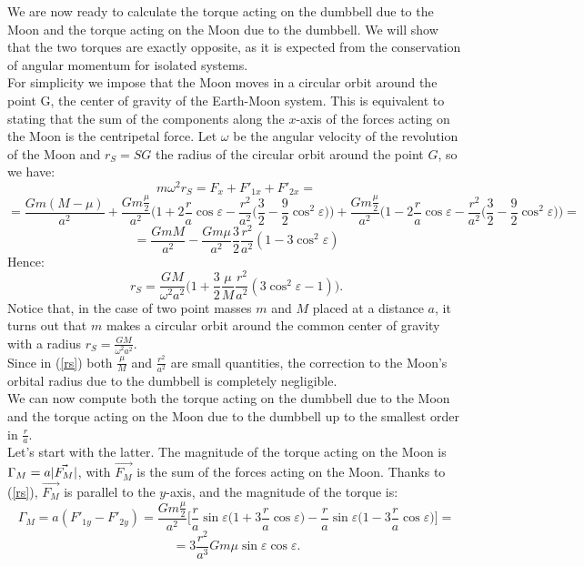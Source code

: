 \documentclass[11pt, oneside,reqno]{amsart}
\DeclarePairedDelimiter{\abs}{\lvert}{\rvert}
\begin{document}
We are now ready to calculate the torque acting on the dumbbell due to the Moon and the torque acting on the Moon due to the dumbbell. We will show that the two torques are exactly opposite, as it is expected from the conservation of angular momentum for isolated systems.\\
For simplicity we impose that the Moon moves in a circular orbit around the point G, the center of gravity of the Earth-Moon system. This is equivalent to stating that the sum of the components along the $x$-axis of the forces acting on the Moon is the centripetal force.
Let $\omega$ be the angular velocity of the revolution of the Moon and $r_S=SG$ the radius of the circular orbit around the point $G$, so we have:
\begin{equation*}
	m\omega^2 r_S = F_x+F'_{1x}+F'_{2x} =
\end{equation*}
\begin{equation*}
	= \frac{Gm(M- \mu)}{a^2}+\frac{Gm\frac{\mu}{2}}{a^2} \biggl( 1 + 2\frac{r}{a} \cos \varepsilon - \frac{r^2}{a^2}\biggl( \frac{3}{2} - \frac{9}{2} \cos^2 \varepsilon \biggr) \biggr) + \frac{Gm\frac{\mu}{2}}{a^2} \biggl( 1 - 2\frac{r}{a} \cos \varepsilon - \frac{r^2}{a^2}	\biggl(	\frac{3}{2} - \frac{9}{2} \cos^2 \varepsilon \biggr) \biggr)=
\end{equation*}
\begin{equation*}
	= \frac{GmM}{a^2} - \frac{Gm\mu}{a^2} \frac{3}{2} \frac{r^2}{a^2} (1-3\cos^2 \varepsilon)
\end{equation*}
Hence:
\begin{equation}
	\label{rs}
	r_S = \frac{GM}{\omega^2 a^2} \biggl(1 +\frac{3}{2} \frac{\mu}{M} \frac{r^2}{a^2} (3\cos^2 \varepsilon -1) \biggr).
\end{equation}
Notice that, in the case of two point masses $m$ and $M$ placed at a distance $a$, it turns out that $m$ makes a circular orbit around the common center of gravity with a radius $r_S=\frac{GM}{\omega^2 a^2}$.\\
Since in (\ref{rs}) both $\frac{\mu}{M}$ and $\frac{r^2}{a^2}$ are small quantities, the correction to the Moon's orbital radius due to the dumbbell is completely negligible.\\

We can now compute both the torque acting on the dumbbell due to the Moon and the torque acting on the Moon due to the dumbbell up to the smallest order in $\frac{r}{a}$.\\
Let's start with the latter. The magnitude of the torque acting on the Moon is $\Gamma_M=a\abs{\vec{F_M}}$, with $\vec{F_M}$ is the sum of the forces acting on the Moon. Thanks to (\ref{rs}), $\vec{F_M}$ is parallel to the $y$-axis, and the magnitude of the torque is:
\begin{equation*}
	\Gamma_M = a (F'_{1y}-F'_{2y}) = \frac{Gm\frac{\mu}{2}}{a^2} \biggr[\frac{r}{a} \sin \varepsilon \biggl( 1 + 3\frac{r}{a} \cos \varepsilon \biggr)-\frac{r}{a} \sin \varepsilon \biggl( 1 - 3\frac{r}{a} \cos \varepsilon \biggr) \biggl]=
\end{equation*}
\begin{equation}
	\label{gammam}
	=3\frac{r^2}{a^3}Gm \mu \sin\varepsilon \cos\varepsilon.
\end{equation} 
 
\end{document}
